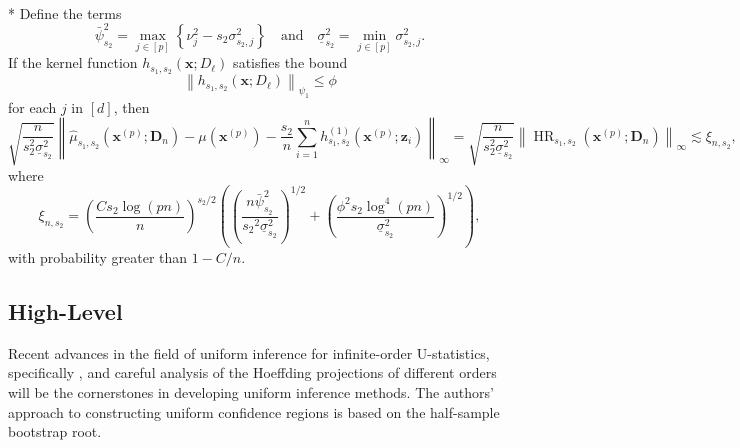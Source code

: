 \begin{boxD}
	\begin{thm}\label{thm:rit4_2}\mbox{}\\*
		Define the terms
		\begin{equation}
			\bar{\psi}_{s_2}^2
			= \max_{j \in[p]}\left\{\nu_j^2- s_2 \sigma_{s_2, j}^2\right\}
			\quad \text {and} \quad
			\underline{\sigma}_{s_2}^2
			= \min_{j \in[p]} \sigma_{s_2, j}^2.
		\end{equation}
		If the kernel function $h_{s_1, s_2}\left(\mathbf{x} ; D_{\ell}\right)$ satisfies the bound
		\begin{equation}
			\left\|h_{s_1, s_2}\left(\mathbf{x} ; D_{\ell}\right)\right\|_{\psi_1} \leq \phi
		\end{equation}
		for each $j$ in $[d]$, then
		\begin{equation}
			\sqrt{\frac{n}{s_2^2 \underline{\sigma}_{s_2}^2}}
			\left\|\hat{\mu}_{s_1, s_2}(\mathbf{x}^{(p)}; \mathbf{D}_n) - \mu(\mathbf{x}^{(p)}) - \frac{s_2}{n} \sum_{i=1}^n h^{(1)}_{s_1, s_2}(\mathbf{x}^{(p)}; \mathbf{z}_{i})\right\|_{\infty}
			= \sqrt{\frac{n}{s_2^2 \underline{\sigma}_{s_2}^2}} \left\|\operatorname{HR}_{s_1, s_2}(\mathbf{x}^{(p)}; \mathbf{D}_n)\right\|_{\infty}
			\lesssim \xi_{n, s_2},
		\end{equation}
		where
		\begin{equation}
			\xi_{n, s_2}
			= \left(\frac{C s_2 \log(p n)}{n}\right)^{s_2 / 2}\left(\left(\frac{n \bar{\psi}_{s_2}^2}{{s_2}^2 \underline{\sigma}_{s_2}^2}\right)^{1 / 2}+\left(\frac{\phi^2 s_2 \log ^4(p n)}{\underline{\sigma}_{s_2}^2}\right)^{1 / 2}\right),
		\end{equation}
		with probability greater than $1-C / n$.
	\end{thm}
\end{boxD}

\subsection{High-Level}
Recent advances in the field of uniform inference for infinite-order U-statistics, specifically \citet{ritzwoller_uniform_2024}, and careful analysis of the Hoeffding projections of different orders will be the cornerstones in developing uniform inference methods.
The authors' approach to constructing uniform confidence regions is based on the half-sample bootstrap root.

